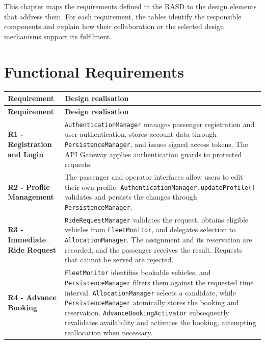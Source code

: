 \documentclass[11pt,a4paper,oneside]{report}
\renewcommand{\arraystretch}{1.22}
\newcommand{\code}[1]{\texttt{#1}}
\begin{document}
This chapter maps the requirements defined in the RASD to the design
elements that address them. For each requirement, the tables identify
the responsible components and explain how their collaboration or the
selected design mechanisms support its fulfilment.

\section{Functional Requirements}
\label{functional-requirements}

\begingroup
\small
\setlength{\tabcolsep}{5pt}
\renewcommand{\arraystretch}{1.2}

\begin{longtable}{@{}
    >{\raggedright\arraybackslash}p{}
    >{\raggedright\arraybackslash}p{}
@{}}
\toprule
\textbf{Requirement} & \textbf{Design realisation} \\
\midrule
\endfirsthead

\toprule
\textbf{Requirement} & \textbf{Design realisation} \\
\midrule
\endhead

\bottomrule
\endlastfoot

\textbf{R1 - Registration and Login}
&
\code{AuthenticationManager} manages passenger registration and user
authentication, stores account data through \code{PersistenceManager},
and issues signed access tokens. The API Gateway applies authentication
guards to protected requests.
\\

\textbf{R2 - Profile Management}
&
The passenger and operator interfaces allow users to edit their own
profile. \code{AuthenticationManager.updateProfile()} validates and
persists the changes through \code{PersistenceManager}.
\\

\textbf{R3 - Immediate Ride Request}
&
\code{RideRequestManager} validates the request, obtains eligible
vehicles from \code{FleetMonitor}, and delegates selection to
\code{AllocationManager}. The assignment and its reservation are
recorded, and the passenger receives the result. Requests that cannot
be served are rejected.
\\

\textbf{R4 - Advance Booking}
&
\code{FleetMonitor} identifies bookable vehicles, and
\code{PersistenceManager} filters them against the requested time
interval. \code{AllocationManager} selects a candidate, while
\code{PersistenceManager} atomically stores the booking and reservation.
\code{AdvanceBookingActivator} subsequently revalidates availability
and activates the booking, attempting reallocation when necessary.
\\


\end{longtable}
\end{document}
